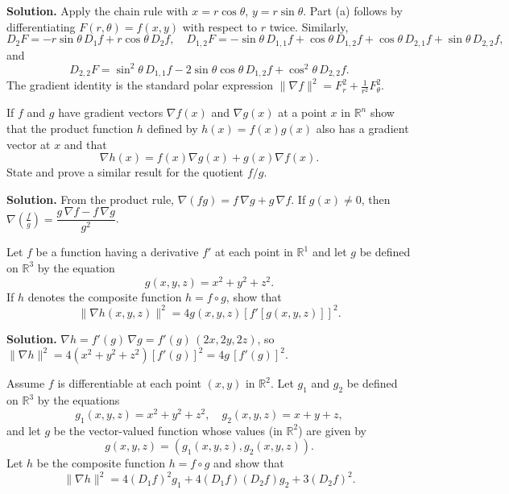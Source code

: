 \noindent\textbf{Solution.}
Apply the chain rule with $x=r\cos\theta$, $y=r\sin\theta$. Part (a) follows by differentiating $F(r,\theta)=f(x,y)$ with respect to $r$ twice. Similarly,
\[D_2F=-r\sin\theta\,D_1f+r\cos\theta\,D_2f,\quad D_{1,2}F=-\sin\theta\,D_{1,1}f+\cos\theta\,D_{1,2}f+\cos\theta\,D_{2,1}f+\sin\theta\,D_{2,2}f,\]
and
\[D_{2,2}F=\sin^2\!\theta\,D_{1,1}f-2\sin\theta\cos\theta\,D_{1,2}f+\cos^2\!\theta\,D_{2,2}f.\]
The gradient identity is the standard polar expression $\|\nabla f\|^2=F_r^2+\tfrac{1}{r^2}F_\theta^2$.

\begin{problembox}
If \( f \) and \( g \) have gradient vectors \( \nabla f(x) \) and \( \nabla g(x) \) at a point \( x \) in \( \mathbb{R}^n \) show that the product function \( h \) defined by \( h(x) = f(x)g(x) \) also has a gradient vector at \( x \) and that
\[\nabla h(x) = f(x)\nabla g(x) + g(x)\nabla f(x).\]
State and prove a similar result for the quotient \( f/g \).
\end{problembox}

\noindent\textbf{Solution.}
From the product rule, $\nabla(fg)=f\,\nabla g+g\,\nabla f$. If $g(x)\ne0$, then $\nabla\!\left(\frac{f}{g}\right)=\dfrac{g\,\nabla f-f\,\nabla g}{g^2}$.

\begin{problembox}
Let \( f \) be a function having a derivative \( f' \) at each point in \( \mathbb{R}^1 \) and let \( g \) be defined on \( \mathbb{R}^3 \) by the equation
\[g(x, y, z) = x^2 + y^2 + z^2.\]
If \( h \) denotes the composite function \( h = f \circ g \), show that
\[\| \nabla h(x, y, z) \|^2 = 4g(x, y, z)[f'[g(x, y, z)]]^2.\]
\end{problembox}

\noindent\textbf{Solution.}
$\nabla h=f'(g)\,\nabla g=f'(g)\,(2x,2y,2z)$, so $\|\nabla h\|^2=4(x^2+y^2+z^2)[f'(g)]^2=4g\,[f'(g)]^2$.

\begin{problembox}
Assume \( f \) is differentiable at each point \( (x, y) \) in \( \mathbb{R}^2 \). Let \( g_1 \) and \( g_2 \) be defined on \( \mathbb{R}^3 \) by the equations
\[g_1(x, y, z) = x^2 + y^2 + z^2, \quad g_2(x, y, z) = x + y + z,\]
and let \( g \) be the vector-valued function whose values (in \( \mathbb{R}^2 \)) are given by
\[g(x, y, z) = (g_1(x, y, z), g_2(x, y, z)).\]
Let \( h \) be the composite function \( h = f \circ g \) and show that
\[\| \nabla h \|^2 = 4(D_1f)^2g_1 + 4(D_1f)(D_2f)g_2 + 3(D_2f)^2.\]
\end{problembox}

